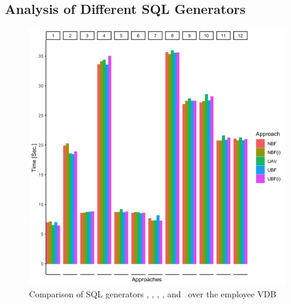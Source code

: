 \subsection{Analysis of Different SQL Generators}
\label{sec:exp-gen}



\begin{figure}[!t]
\centering
\includegraphics[scale=0.12] {figs/plots/emp1-5.png}
\caption[Comparison of SQL generators \nbf, \nbfi, \uav, \ubf, and \ubfi\ over the employee VDB]{Comparison of SQL generators \nbf, \nbfi, \uav, \ubf, and \ubfi\ over the employee VDB}
\label{fig:emp1-5}
\end{figure}



